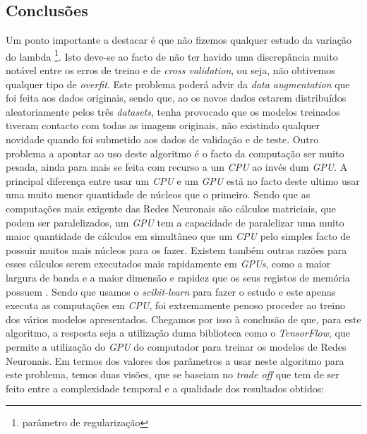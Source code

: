 \subsection{Conclusões}
Um ponto importante a destacar é que não fizemos qualquer estudo da variação do lambda \footnote{parâmetro de regularização}. Isto deve-se ao facto de não ter havido uma discrepância muito notável entre os erros de treino e de \textit{cross validation}, ou seja, não obtivemos qualquer tipo de \textit{overfit}. Este problema poderá advir da \textit{data augmentation} que foi feita aos dados originais, sendo que, ao os novos dados estarem distribuídos aleatoriamente pelos três \textit{datasets}, tenha provocado que os modelos treinados tiveram contacto com todas as imagens originais, não existindo qualquer novidade quando foi submetido aos dados de validação e de teste.
Outro problema a apontar ao uso deste algoritmo é o facto da computação ser muito pesada, ainda para mais se feita com recurso a um \textit{CPU} ao invés dum \textit{GPU}. A principal diferença entre usar um \textit{CPU} e um \textit{GPU} está no facto deste ultimo usar   uma muito menor quantidade de núcleos que o primeiro. Sendo que as computações mais exigente das Redes Neuronais são cálculos matriciais, que podem ser paralelizados, um \textit{GPU} tem a capacidade de paralelizar uma muito maior quantidade de cálculos em simultâneo que um \textit{CPU} pelo simples facto de possuir muitos mais núcleos para os fazer. Existem também outras razões para esses cálculos serem executados mais rapidamente em \textit{GPUs}, como a maior largura de banda e a maior dimensão e rapidez que os seus registos de memória possuem \cite{cpu_vs_gpu}. Sendo que usamos o \textit{scikit-learn} para fazer o estudo e este apenas executa as computações em \textit{CPU}, foi extremamente penoso proceder ao treino dos vários modelos apresentados. Chegamos por isso à conclusão de que, para este algoritmo, a resposta seja a utilização duma biblioteca como o \textit{TensorFlow}, que permite a utilização do \textit{GPU} do computador para treinar os modelos de Redes Neuronais.
Em termos dos valores dos parâmetros a usar neste algoritmo para este problema, temos duas visões, que se baseiam no \textit{trade off} que tem de ser feito entre a complexidade temporal e a qualidade dos resultados obtidos:
